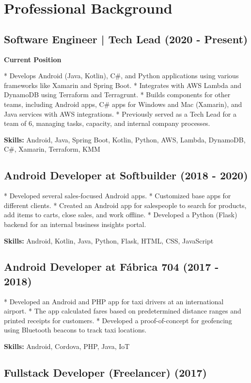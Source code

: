\section{Professional Background}

\subsection{Software Engineer | Tech Lead (2020 - Present)}

\textbf{Current Position}

* Develops Android (Java, Kotlin), C\#, and Python applications using various frameworks like Xamarin and Spring Boot.
* Integrates with AWS Lambda and DynamoDB using Terraform and Terragrunt.
* Builds components for other teams, including Android apps, C\# apps for Windows and Mac (Xamarin), and Java services with AWS integrations.
* Previously served as a Tech Lead for a team of 6, managing tasks, capacity, and internal company processes.

\textbf{Skills:} Android, Java, Spring Boot, Kotlin, Python, AWS, Lambda, DynamoDB, C\#, Xamarin, Terraform, KMM

\subsection{Android Developer at Softbuilder (2018 - 2020)}

* Developed several sales-focused Android apps.
* Customized base apps for different clients.
* Created an Android app for salespeople to search for products, add items to carts, close sales, and work offline.
* Developed a Python (Flask) backend for an internal business insights portal.

\textbf{Skills:} Android, Kotlin, Java, Python, Flask, HTML, CSS, JavaScript


\subsection{Android Developer at Fábrica 704 (2017 - 2018)}

* Developed an Android and PHP app for taxi drivers at an international airport.
* The app calculated fares based on predetermined distance ranges and printed receipts for customers.
* Developed a proof-of-concept for geofencing using Bluetooth beacons to track taxi locations.

\textbf{Skills:} Android, Cordova, PHP, Java, IoT

\subsection{Fullstack Developer (Freelancer) (2017)}

